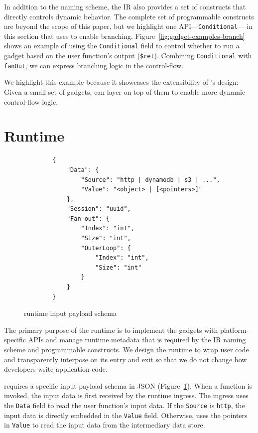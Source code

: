 In addition to the naming scheme, the IR also provides a set of constructs
that directly controls dynamic behavior. The complete set of programmable
constructs are beyond the scope of this paper, but we highlight one
API---\texttt{Conditional}--- in this section that \name{} uses to enable
branching. Figure~\ref{fig:gadget-examples-branch} shows an example of using
the \texttt{Conditional} field to control whether to run a gadget based on the
user function's output (\texttt{\$ret}). Combining \texttt{Conditional} with
\texttt{fanOut}, we can express branching logic in the control-flow. 

We highlight this example because it showcases the extensibility of \name{}'s
design: Given a small set of gadgets, \name{} can layer on top of them to
enable more dynamic control-flow logic.


\section{Runtime}

\begin{figure}[]
	\begin{verbatim}
		{
			"Data": {
				"Source": "http | dynamodb | s3 | ...",
				"Value": "<object> | [<pointers>]"
			},
			"Session": "uuid",
			"Fan-out": {
				"Index": "int",
				"Size": "int",
				"OuterLoop": {
					"Index": "int",
					"Size": "int"
				}
			}
		}
	\end{verbatim}
	\caption{\name{} runtime input payload schema}
	\label{fig:input-format}
\end{figure}

The primary purpose of the \name{} runtime is to implement the gadgets with
platform-specific APIs and manage runtime metadata that is required by the
\name{} IR naming scheme and programmable constructs. We design the runtime to
wrap user code and transparently interpose on its entry and exit so that we do
not change how developers write application code.

\name{} requires a specific input payload schema in JSON
(Figure~\ref{fig:input-format}). When a function is invoked, the input data is
first received by the runtime ingress. The ingress uses the \texttt{Data}
field to read the user function's input data. If the \texttt{Source} is
\texttt{http}, the input data is directly embedded in the \texttt{Value}
field. Otherwise, \name{} uses the pointers in \texttt{Value} to read the
input data from the intermediary data store.

